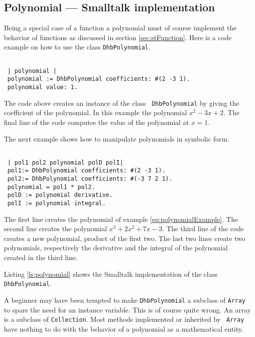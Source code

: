\documentclass[twoside]{book}
\begin{document}
\subsection{Polynomial --- Smalltalk implementation}
\label{sec:stPolynomial}  Being a special case of a
function a polynomial must of course implement the behavior of
functions as discussed in section \ref{sec:stFunction}. Here is a
code example on how to use the class {\tt DhbPolynomial}.
\begin{codeExample}
\begin{verbatim}

 | polynomial |
 polynomial := DhbPolynomial coefficients: #(2 -3 1).
 polynomial value: 1.
\end{verbatim}
\end{codeExample}
The code above creates an instance of the class {\tt
DhbPolynomial} by giving the coefficient of the polynomial. In
this example the polynomial $x^2-3x+2$. The final line of the code
computes the value of the polynomial at $x=1$.

The next example shows how to manipulate polynomials in symbolic
form.
\begin{codeExample}
\begin{verbatim}

 | pol1 pol2 polynomial polD polI|
 pol1:= DhbPolynomial coefficients: #(2 -3 1).
 pol2:= DhbPolynomial coefficients: #(-3 7 2 1).
 polynomial = pol1 * pol2.
 polD := polynomial derivative.
 polI := polynomial integral.
\end{verbatim}
\end{codeExample}
The first line creates the  polynomial of example
\ref{eq:polynomialExample}. The second line creates the polynomial
$x^3+2x^2+7x-3$. The third line of the code creates a new
polynomial, product of the first two. The last two lines create
two polynomials, respectively the derivative and the integral of
the polynomial created in the third line.

Listing \ref{ls:polynomial} shows the Smalltalk implementation of
the class {\tt DhbPolynomial}.

A beginner may have been tempted to make {\tt DhbPolynomial} a
subclass of {\tt Array} to spare the need for an instance
variable. This is of course quite wrong. An array is a subclass of
{\tt Collection}. Most methods implemented or inherited by {\tt
Array} have nothing to do with the behavior of a polynomial as a
mathematical entity.
\end{document}
